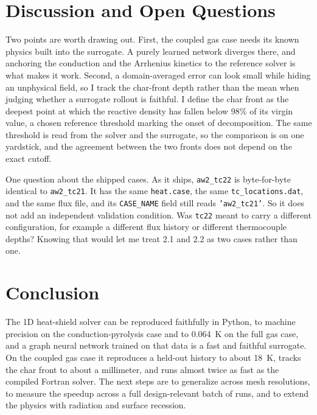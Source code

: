 \documentclass[11pt]{article}
\begin{document}
\section{Discussion and Open Questions}
Two points are worth drawing out. First, the coupled gas case needs its known
physics built into the surrogate. A purely learned network diverges there, and
anchoring the conduction and the Arrhenius kinetics to the reference solver is what
makes it work. Second, a domain-averaged error can look small while hiding an
unphysical field, so I track the char-front depth rather than the mean when judging
whether a surrogate rollout is faithful. I define the char front as the deepest point at which the reactive
density has fallen below 98\% of its virgin value, a chosen reference threshold
marking the onset of decomposition. The same threshold is read from the solver and
the surrogate, so the comparison is on one yardstick, and the agreement between the
two fronts does not depend on the exact cutoff.

One question about the shipped cases. As it ships, \texttt{aw2\_tc22} is
byte-for-byte identical to \texttt{aw2\_tc21}. It has the same \texttt{heat.case},
the same \texttt{tc\_locations.dat}, and the same flux file, and its
\texttt{CASE\_NAME} field still reads \texttt{'aw2\_tc21'}. So it does not add an
independent validation condition. Was \texttt{tc22} meant to carry a different
configuration, for example a different flux history or different thermocouple
depths? Knowing that would let me treat 2.1 and 2.2 as two cases rather than one.

\section{Conclusion}
The 1D heat-shield solver can be reproduced faithfully in Python, to machine
precision on the conduction-pyrolysis case and to 0.064~K on the full gas case, and
a graph neural network trained on that data is a fast and faithful surrogate. On
the coupled gas case it reproduces a held-out history to about 18~K, tracks the
char front to about a millimeter, and runs almost twice as fast as the compiled
Fortran solver. The next steps are to generalize across mesh resolutions, to measure the
speedup across a full design-relevant batch of runs, and to extend the physics with
radiation and surface recession.



\end{document}
